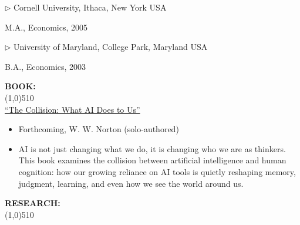 \documentclass[11pt]{article}
\newenvironment{list1}{
  \begin{list}{\ding{113}}{%
      \setlength{\itemsep}{0in}
      \setlength{\parsep}{0in} \setlength{\parskip}{0in}
      \setlength{\topsep}{0in} \setlength{\partopsep}{0in} 
      \setlength{\leftmargin}{0.17in}}}{\end{list}}
\begin{document}
\vspace*{.1in}
$\triangleright$ Cornell University, Ithaca, New York USA\\
\vspace*{-.15in}
\begin{list1}
\item[] M.A., Economics,  2005
\end{list1}

\vspace*{.1in}
$\triangleright$ University of Maryland, College Park, Maryland USA\\
\vspace*{-.15in}
\begin{list1}
\item[] B.A., Economics,  2003
\end{list1}

\vskip 0.75cm
\setlength{\parindent}{0in}
{\bf BOOK:\\}
\vskip -0.85cm \line(1,0){510} \\
\setlength{\parindent}{0in}
\vspace*{0.1in}
\href{https://ericso.pro/the-collision/}{``The Collision: What AI Does to Us''}
\begin{itemize}
\vspace*{-.07in}
	\item Forthcoming, W. W. Norton (solo-authored)
\vspace*{-.07in}
	\item AI is not just changing what we do, it is changing who we are as thinkers. This book examines the collision between artificial intelligence and human cognition: how our growing reliance on AI tools is quietly reshaping memory, judgment, learning, and even how we see the world around us.
\end{itemize}

\vskip 0.75cm
\setlength{\parindent}{0in}
{\bf RESEARCH:\\}
\vskip -0.85cm \line(1,0){510} \\ %
\end{document}
